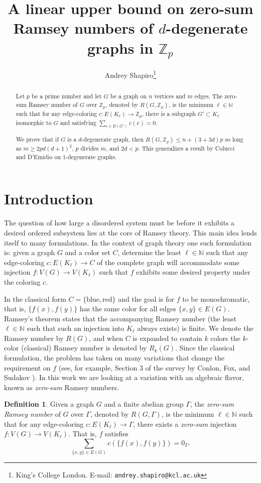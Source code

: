 \documentclass{article}
\title{A linear upper bound on zero-sum Ramsey numbers of $d$-degenerate graphs in $\mathbb{Z}_p$}
\author{Andrey Shapiro\thanks{King's College London. E-mail: \tt{andrey.shapiro@kcl.ac.uk}}}
\date{}
\newcommand\NN{{\mathbb N}}
\theoremstyle{definition}
\newtheorem{defn}[theorem]{Definition}
\begin{document}
\maketitle
\begin{abstract}
 Let $p$ be a prime number and let $G$ be a graph on $n$ vertices and $m$ edges. The zero-sum Ramsey number of $G$ over $\mathbb{Z}_p$, denoted by $R(G, \mathbb{Z}_p)$, is the minimum $\ell\in \mathbb{N}$ such that for any edge-coloring $c:E(K_\ell)\to\mathbb{Z}_p$, there is a subgraph $G'\subset K_\ell$ isomorphic to $G$ and satisfying $\sum_{e\in E(G')}c(e)=0$.
 
 We prove that if $G$ is a $d$-degenerate graph, then $R(G, \mathbb{Z}_p)\leq n + (3+3d)p$ so long as $m\geq 2pd(d+1)^2$, $p$ divides $m$, and $2d<p$. This generalizes a result by Colucci and D'Emidio on $1$-degenerate graphs. 
    \end{abstract}
\section{Introduction}

The question of how large a disordered system must be before it exhibits a desired ordered subsystem lies at the core of Ramsey theory. This main idea lends itself to many formulations. In the context of graph theory one such formulation is: given a graph $G$ and a color set $C$, determine the least $\ell\in \mathbb{N}$ such that any edge-coloring $c:E(K_\ell)\to C$ of the complete graph will accommodate some injection $f:V(G)\to V(K_\ell)$ such that $f$ exhibits some desired property under the coloring $c$.

In the classical form $C=\{\text{blue},\text{red}\}$ and the goal is for $f$ to be monochromatic, that is, $\{f(x),f(y)\}$ has the same color for all edges $\{x,y\}\in E(G)$. Ramsey's theorem \cite{ramsey} states that the accompanying Ramsey number (the least $\ell \in \mathbb{N}$ such that such an injection into $K_\ell$ always exists) is finite. We denote the Ramsey number by $R(G)$, and when $C$ is expanded to contain $k$ colors the $k$-color (classical) Ramsey number is denoted by $R_k(G)$. Since the classical formulation, the problem has taken on many variations that change the requirement on $f$ (see, for example, Section 3 of the survey by Conlon, Fox, and Sudakov \cite{CFS15}). In this work we are looking at a variation with an algebraic flavor, known as \emph{zero-sum} Ramsey numbers. 

\begin{defn}\label{def:zero_sum}
    Given a graph $G$ and a finite abelian group $\Gamma$, the \emph{zero-sum Ramsey number} of $G$ over $\Gamma$, denoted by $R(G, \Gamma)$,  is the minimum $\ell\in \NN$ such that for any edge-coloring $c:E(K_\ell)\to \Gamma$, there exists a \emph{zero-sum} injection $f:V(G)\to V(K_\ell)$. That is, $f$ satisfies $$\sum_{\{x,y\}\in E(G)} c(\{f(x),f(y)\})=0_\Gamma.$$ 
\end{defn}
\end{document}
